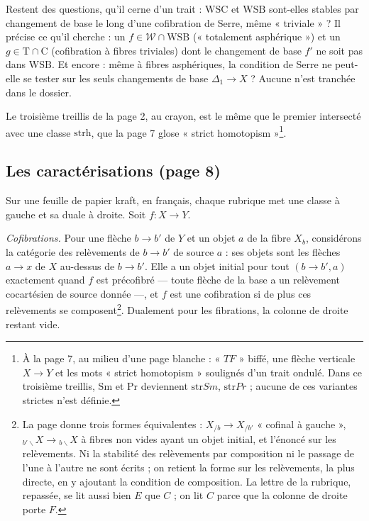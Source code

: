 \documentclass[11pt,a4paper]{article}
\begin{document}
Restent des questions, qu'il cerne d'un trait : $\mathrm{WSC}$ et
$\mathrm{WSB}$ sont-elles stables par changement de base le long d'une
cofibration de Serre, même « triviale » ? Il précise ce qu'il cherche : un
$f \in \mathcal{W} \cap \mathrm{WSB}$ (« totalement asphérique ») et un
$g \in \mathrm{T} \cap \mathrm{C}$ (cofibration à fibres triviales) dont le
changement de base $f'$ ne soit pas dans $\mathrm{WSB}$. Et encore : même à
fibres asphériques, la condition de Serre ne peut-elle se tester sur les seuls
changements de base $\Delta_{1} \to X$ ? Aucune n'est tranchée dans le
dossier.

Le troisième treillis de la page 2, au crayon, est le même que le premier
intersecté avec une classe $\mathrm{strh}$, que la page 7 glose « strict
homotopism »\footnote{À la page 7, au milieu d'une page blanche : « $TF$ »
biffé, une flèche verticale $X \to Y$ et les mots « strict homotopism »
soulignés d'un trait ondulé. Dans ce troisième treillis, $\mathrm{Sm}$ et
$\mathrm{Pr}$ deviennent $\mathrm{str}Sm$, $\mathrm{str}Pr$ ; aucune de ces
variantes strictes n'est définie.}.

\subsection*{Les caractérisations (page 8)}

Sur une feuille de papier kraft, en français, chaque rubrique met une classe à
gauche et sa duale à droite. Soit $f : X \to Y$.

\emph{Cofibrations.} Pour une flèche $b \to b'$ de $Y$ et un objet $a$ de la
fibre $X_{b}$, considérons la catégorie des relèvements de $b \to b'$ de source
$a$ : ses objets sont les flèches $a \to x$ de $X$ au-dessus de $b \to b'$.
Elle a un objet initial pour tout $(b \to b', a)$ exactement quand $f$ est
précofibré --- toute flèche de la base a un relèvement cocartésien de source
donnée ---, et $f$ est une cofibration si de plus ces relèvements se
composent\footnote{La page donne trois formes équivalentes : $X_{/b} \to
X_{/b'}$ « cofinal à gauche », ${}_{b'\backslash}X \to {}_{b\backslash}X$ à
fibres non vides ayant un objet initial, et l'énoncé sur les relèvements. Ni
la stabilité des relèvements par composition ni le passage de l'une à l'autre
ne sont écrits ; on retient la forme sur les relèvements, la plus directe, en
y ajoutant la condition de composition. La lettre de la rubrique, repassée, se
lit aussi bien $E$ que $C$ ; on lit $C$ parce que la colonne de droite porte
$F$.}. Dualement pour les fibrations, la colonne de droite restant vide.
\end{document}

